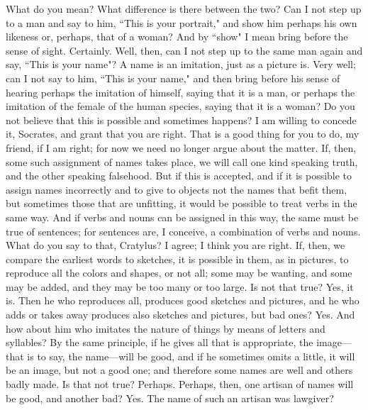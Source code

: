 {{{{{\socratesspeaks
What do you mean? What difference is there between the two? Can I not step up to a man and say to him, ``This is your portrait," and show him perhaps his own likeness or, perhaps, that of a woman? And by ``show" I mean bring before the sense of sight.
\cratylusspeaks
Certainly.
\socratesspeaks
Well, then, can I not step up to the same man again and say, ``This is your name"? A name is an imitation, just as a picture is.  Very well; can I not say to him, ``This is your name," and then bring before his sense of hearing perhaps the imitation of himself, saying that it is a man, or perhaps the imitation of the female of the human species, saying that it is a woman? Do you not believe that this is possible and sometimes happens?
\cratylusspeaks
I am willing to concede it, Socrates, and grant that you are right.
\socratesspeaks
That is a good thing for you to do, my friend, if I am right; for now we need no longer argue about the matter.  If, then, some such assignment of names takes place, we will call one kind speaking truth, and the other speaking falsehood. But if this is accepted, and if it is possible to assign names incorrectly and to give to objects not the names that befit them, but sometimes those that are unfitting, it would be possible to treat verbs in the same way. And if verbs and nouns can be assigned in this way, the same must be true of sentences; for sentences are, I conceive, a combination of verbs and nouns.  What do you say to that, Cratylus?
\cratylusspeaks
I agree; I think you are right.
\socratesspeaks
If, then, we compare the earliest words to sketches, it is possible in them, as in pictures, to reproduce all the colors and shapes, or not all; some may be wanting, and some may be added, and they may be too many or too large. Is not that true?
\cratylusspeaks
Yes, it is.
\socratesspeaks
Then he who reproduces all, produces good sketches and pictures, and he who adds or takes away produces also sketches and pictures, but bad ones? 
\cratylusspeaks
Yes.
\socratesspeaks
And how about him who imitates the nature of things by means of letters and syllables? By the same principle, if he gives all that is appropriate, the image—that is to say, the name—will be good, and if he sometimes omits a little, it will be an image, but not a good one; and therefore some names are well and others badly made. Is that not true?
\cratylusspeaks
Perhaps. 
\socratesspeaks
Perhaps, then, one artisan of names will be good, and another bad?
\cratylusspeaks
Yes.
\socratesspeaks
The name of such an artisan was lawgiver?
}}}}}

